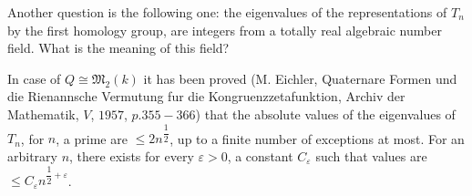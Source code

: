 Another question is the following one: the eigenvalues of the
representations of $T_n$ by the first homology group, are integers
from a totally real algebraic number field. What is the meaning of
this field? 

In case of $Q \cong \mathfrak{M}_2(k)$ it has been proved
(M. Eichler, Quaternare Formen und die Rienannsche Vermutung fur die
Kongruenzzetafunktion, Archiv der Mathematik, $V$, $1957$,
$p. 355-366$) that the absolute values of the eigenvalues of $T_n$,
for $n$, a prime are $\leq 2n^{\dfrac{1}{2}}$, up to a finite number
of exceptions at most. For an arbitrary $n$, there exists for every
$\varepsilon > 0$, a constant $C_\varepsilon$ such that values are
$\leq C_\varepsilon n^{\dfrac{1}{2}+ \varepsilon}$. 
